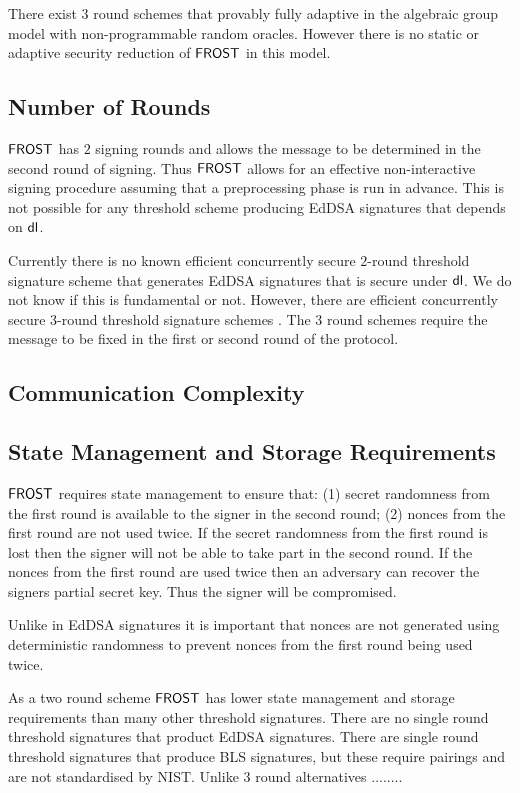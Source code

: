 There exist $3$ round schemes that provably fully adaptive \cite{} in the algebraic group model with non-programmable random oracles.  However there is no static or adaptive security reduction of $\mathsf{FROST}$ in this model.  

\subsection{Number of Rounds}\label{section:comparisons:rounds}
$\mathsf{FROST}$ has $2$ signing rounds and allows the message to be determined in the second round of signing.
Thus $\mathsf{FROST}$ allows for an effective non-interactive signing procedure assuming that a preprocessing phase is run in advance.
This is not possible for any threshold scheme producing EdDSA signatures that depends on $\mathsf{dl}$.

Currently there is no known efficient concurrently secure $2$-round threshold signature scheme that generates EdDSA signatures that is secure under $\mathsf{dl}$.
We do not know if this is fundamental or not.  However, there are efficient concurrently secure $3$-round threshold signature schemes \cite{}.
The $3$ round schemes require the message to be fixed in the first or second round of the protocol.

\subsection{Communication Complexity}

\subsection{State Management and Storage Requirements}
$\mathsf{FROST}$ requires state management to ensure that:
(1) secret randomness from the first round is available to the signer in the second round;
(2) nonces from the first round are not used twice.
If the secret randomness from the first round is lost then the signer will not be able to take part in the second round.
If the nonces from the first round are used twice then an adversary can recover the signers partial secret key.
Thus the signer will be compromised.

Unlike in EdDSA signatures it is important that nonces are not generated using deterministic randomness to prevent nonces from the first round being used twice.

As a two round scheme $\mathsf{FROST}$ has lower state management and storage requirements than many other threshold signatures.
There are no single round threshold signatures that product EdDSA signatures.
There are single round threshold signatures that produce BLS signatures, but these require pairings and are not standardised by NIST.
Unlike $3$ round alternatives ........


